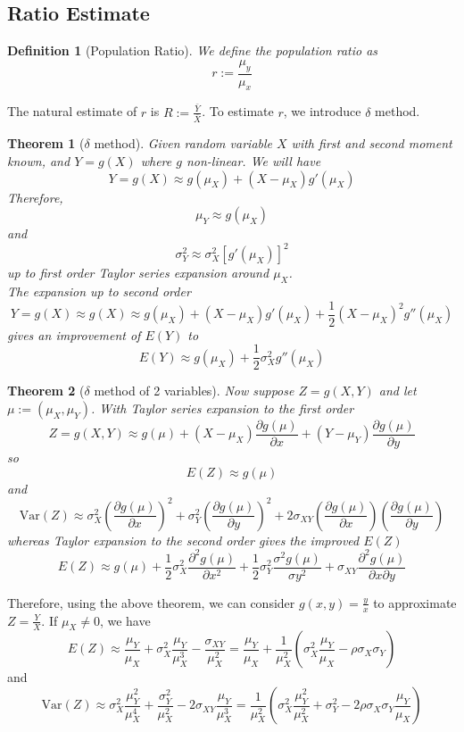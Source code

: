 \documentclass[12pt]{article}
\newcommand{\var}{\mathrm{Var}}
\newtheorem{definition}{Definition}[section]
\newtheorem{theorem}{Theorem}[section]
\theoremstyle{definition}
\begin{document}
\subsection{Ratio Estimate}
\begin{definition}[Population Ratio]
\normalfont We define the population ratio as 
\[
r:=\frac{\mu_y}{\mu_x}
\]
\end{definition}
The natural estimate of $r$ is $R:=\frac{\bar{Y}}{\bar{X}}$. To estimate $r$, we introduce $\delta$ method.
\begin{theorem}[{$\delta$} method]
\normalfont Given random variable $X$ with first and second moment known, and $Y=g(X)$ where $g$ non-linear. We will have
\[
Y=g(X)\approx g(\mu_X)+(X-\mu_X)g'(\mu_X)
\] 
Therefore,
\[
\mu_Y\approx g(\mu_X)
\]
and
\[
\sigma_Y^2 \approx \sigma_X^2[g'(\mu_X)]^2
\]
up to first order Taylor series expansion around $\mu_X$.\\
The expansion up to second order
\[
Y=g(X)\approx g(X)\approx g(\mu_X)+(X-\mu_X)g'(\mu_X) + \frac{1}{2}(X-\mu_X)^2g''(\mu_X)
\]
gives an improvement of $E(Y)$ to 
\[
E(Y)\approx g(\mu_X)+\frac{1}{2}\sigma_X^2g''(\mu_X)
\]
\end{theorem}
\begin{theorem}[{$\delta$} method of 2 variables]
\normalfont Now suppose $Z=g(X,Y)$ and let $\mu:=(\mu_X,\mu_Y)$. With Taylor series expansion to the first order
\[
Z=g(X,Y)\approx g(\mu)+(X-\mu_X)\frac{\partial g(\mu)}{\partial x}+(Y-\mu_Y)\frac{\partial g(\mu)}{\partial y}
\]
so
\[
E(Z)\approx g(\mu)
\]
and
\[
\var(Z)\approx \sigma_X^2(\frac{\partial g(\mu)}{\partial x})^2+\sigma_Y^2(\frac{\partial g(\mu)}{\partial y})^2 + 2\sigma_{XY} (\frac{\partial g(\mu)}{\partial x})(\frac{\partial g(\mu)}{\partial y})
\]
whereas Taylor expansion to the second order gives the improved $E(Z)$
\[
E(Z)\approx g(\mu)+\frac{1}{2}\sigma_X^2\frac{\partial^2 g(\mu)}{\partial x^2}+\frac{1}{2}\sigma_Y^2 \frac{\sigma^2 g(\mu)}{\sigma y^2}+\sigma_{XY}\frac{\partial^2 g(\mu)}{\partial x\partial y}
\]
\end{theorem}
Therefore, using the above theorem, we can consider $g(x,y)= \frac{y}{x}$ to approximate $Z=\frac{Y}{X}$. If $\mu_X\neq 0$, we have
\[
E(Z)\approx \frac{\mu_Y}{\mu_X}+\sigma_X^2\frac{\mu_Y}{\mu_X^3}-\frac{\sigma_{XY}}{\mu_X^2} = \frac{\mu_Y}{\mu_X}+\frac{1}{\mu_X^2}(\sigma^2_X\frac{\mu_Y}{\mu_X}-\rho\sigma_X\sigma_Y)
\]
and
\[
\var(Z)\approx \sigma_X^2\frac{\mu_Y^2}{\mu_X^4}+\frac{\sigma_Y^2}{\mu_X^2}-2\sigma_{XY}\frac{\mu_Y}{\mu_X^3} = \frac{1}{\mu_X^2}(\sigma_X^2\frac{\mu_Y^2}{\mu_X^2}+\sigma_Y^2-2\rho\sigma_X\sigma_Y\frac{\mu_Y}{\mu_X})
\]
\end{document}

